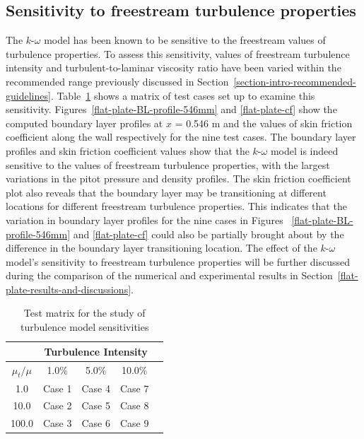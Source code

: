 \subsection{Sensitivity to freestream turbulence properties}
\label{flat-plate-sensitivity}
%
The $k$-$\omega$ model has been known to be sensitive to the freestream 
values of turbulence properties. To assess this sensitivity, values of 
freestream turbulence intensity and turbulent-to-laminar viscosity ratio 
have been varied within the recommended range previously discussed in 
Section~\ref{section-intro-recommended-guidelines}. Table~\ref{sensitivity-study-matrix} 
shows a matrix of test cases set up to examine this sensitivity. 
Figures~\ref{flat-plate-BL-profile-546mm} and \ref{flat-plate-cf} show the computed boundary layer profiles
at $x$ = 0.546 m and the values of skin friction coefficient along the wall respectively for the nine test cases.
The boundary layer profiles and skin friction coefficient values show that the $k$-$\omega$ model 
is indeed sensitive to the values of freestream turbulence properties, with the largest variations
in the pitot pressure and density profiles. The skin friction coefficient plot also reveals that
the boundary layer may be transitioning at different locations for different freestream turbulence properties.
This indicates that the variation in boundary layer profiles for the nine cases 
in Figures ~\ref{flat-plate-BL-profile-546mm} 
and \ref{flat-plate-cf} could also be partially brought about by the difference
in the boundary layer transitioning location. The effect of the $k$-$\omega$ model's sensitivity to freestream 
turbulence properties will be further discussed during the comparison of the numerical and experimental results
in Section~\ref{flat-plate-results-and-discussions}.
\begin{table}[h]
  \caption{Test matrix for the study of turbulence model sensitivities}
  \label{sensitivity-study-matrix}
  \begin{center}
    \begin{tabular}{ccccl}
      \hline\hline
      & \multicolumn{3}{c}{Turbulence Intensity} \\
      \hline
      $\mu_t/\mu$ & 1.0\%  & 5.0\%  & 10.0\% \\
      \hline
      1.0     &  Case 1    &  Case 4    &  Case 7   \\
      10.0    &  Case 2    &  Case 5    &  Case 8   \\
      100.0   &  Case 3    &  Case 6    &  Case 9   \\
      \hline \hline
    \end{tabular}
  \end{center}
\end{table}
